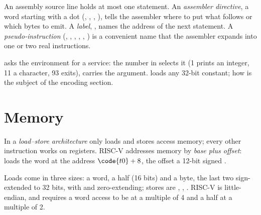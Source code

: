 \begin{definition}\label{def:b2:assembly-and-calling-convention:directive}
An assembly source line holds at most one statement. An \emph{assembler directive}, a
word starting with a dot (, , , ), tells the assembler where to put
what follows or which bytes to emit. A \emph{label}, , names the address of the
next statement. A \emph{pseudo-instruction} (, , , ,
, ) is a convenient name that the assembler expands into one or two real instructions.
\end{definition}

 asks the environment for a service: the number in  selects it (1 prints an integer, 11 a
character, 93 exits),  carries the argument.  loads any 32-bit constant; how is the subject of
the encoding section.

\section{Memory}\label{sec:b2:assembly-and-calling-convention:memory}

\begin{definition}\label{def:b2:assembly-and-calling-convention:load-store}
In a \emph{load--store architecture} only loads and stores access memory; every other
instruction works on registers. RISC-V addresses memory by \emph{base plus offset}:  loads the word at the address $\code{t0} + 8$, the offset a 12-bit signed .
\end{definition}

Loads come in three sizes:  a word,  a half (16 bits) and  a byte, the last two
sign-extended to 32 bits, with  and  zero-extending; stores are , ,
. RISC-V is little-endian, and  requires a word access to be at a multiple of 4 and a half at a
multiple of 2.

\label{lst:b2:assembly-and-calling-convention:memory}

